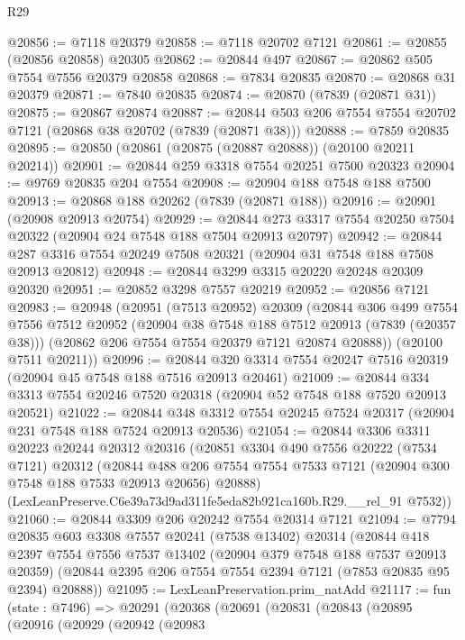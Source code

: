 \begin{lexlean}{R29}
\begin{coremodule}
@20856 := @7118 @20379
@20858 := @7118 @20702 @7121
@20861 := @20855 (@20856 @20858) @20305
@20862 := @20844 @497
@20867 := @20862 @505 @7554 @7556 @20379 @20858
@20868 := @7834 @20835
@20870 := @20868 @31 @20379
@20871 := @7840 @20835
@20874 := @20870 (@7839 (@20871 @31))
@20875 := @20867 @20874
@20887 := @20844 @503 @206 @7554 @7554 @20702 @7121 (@20868 @38 @20702 (@7839 (@20871 @38)))
@20888 := @7859 @20835
@20895 := @20850 (@20861 (@20875 (@20887 @20888)) (@20100 @20211 @20214))
@20901 := @20844 @259 @3318 @7554 @20251 @7500 @20323
@20904 := @9769 @20835 @204 @7554
@20908 := @20904 @188 @7548 @188 @7500
@20913 := @20868 @188 @20262 (@7839 (@20871 @188))
@20916 := @20901 (@20908 @20913 @20754)
@20929 := @20844 @273 @3317 @7554 @20250 @7504 @20322 (@20904 @24 @7548 @188 @7504 @20913 @20797)
@20942 := @20844 @287 @3316 @7554 @20249 @7508 @20321 (@20904 @31 @7548 @188 @7508 @20913 @20812)
@20948 := @20844 @3299 @3315 @20220 @20248 @20309 @20320
@20951 := @20852 @3298 @7557 @20219
@20952 := @20856 @7121
@20983 := @20948
    (@20951
      (@7513 @20952)
      @20309
      (@20844
        @306
        @499
        @7554
        @7556
        @7512
        @20952
        (@20904 @38 @7548 @188 @7512 @20913 (@7839 (@20357 @38)))
        (@20862 @206 @7554 @7554 @20379 @7121 @20874 @20888))
      (@20100 @7511 @20211))
@20996 := @20844 @320 @3314 @7554 @20247 @7516 @20319 (@20904 @45 @7548 @188 @7516 @20913 @20461)
@21009 := @20844 @334 @3313 @7554 @20246 @7520 @20318 (@20904 @52 @7548 @188 @7520 @20913 @20521)
@21022 := @20844 @348 @3312 @7554 @20245 @7524 @20317 (@20904 @231 @7548 @188 @7524 @20913 @20536)
@21054 := @20844
    @3306
    @3311
    @20223
    @20244
    @20312
    @20316
    (@20851
      @3304
      @490
      @7556
      @20222
      (@7534 @7121)
      @20312
      (@20844 @488 @206 @7554 @7554 @7533 @7121 (@20904 @300 @7548 @188 @7533 @20913 @20656) @20888)
      (LexLeanPreserve.C6e39a73d9ad311fe5eda82b921ca160b.R29.__rel_91 @7532))
@21060 := @20844 @3309 @206 @20242 @7554 @20314 @7121
@21094 := @7794
    @20835
    @603
    @3308
    @7557
    @20241
    (@7538 @13402)
    @20314
    (@20844
      @418
      @2397
      @7554
      @7556
      @7537
      @13402
      (@20904 @379 @7548 @188 @7537 @20913 @20359)
      (@20844 @2395 @206 @7554 @7554 @2394 @7121 (@7853 @20835 @95 @2394) @20888))
@21095 := LexLeanPreservation.prim_natAdd
@21117 := fun (state : @7496) =>
  @20291
    (@20368
      (@20691
        (@20831
          (@20843
            (@20895
              (@20916
                (@20929
                  (@20942
                    (@20983

\end{coremodule}
\end{lexlean}
